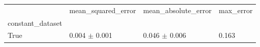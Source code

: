 \begin{tabular}{llll}
\toprule
 & mean_squared_error & mean_absolute_error & max_error \\
constant_dataset &  &  &  \\
\midrule
True & 0.004 $\pm$ 0.001 & 0.046 $\pm$ 0.006 & 0.163 \\
\bottomrule
\end{tabular}
